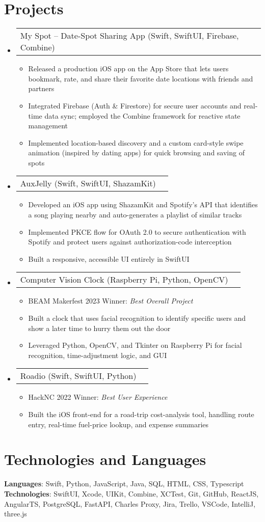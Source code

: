 \documentclass[letterpaper,11pt]{article}
\makeatletter
\newcommand{\resumeItem}[1]{
  \item\small{{#1}}
}
\newcommand{\resumeProjectHeading}[2]{
    \item
    \begin{tabular*}{0.97\textwidth}{l@{\extracolsep{\fill}}r}
      \small#1 & #2 \\
    \end{tabular*}\vspace{-7pt}
}
\newcommand{\resumeSubHeadingListStart}{\begin{itemize}[leftmargin=0.15in, label={}]}
\newcommand{\resumeSubHeadingListEnd}{\end{itemize}}
\newcommand{\resumeItemListStart}{\begin{itemize}}
\newcommand{\resumeItemListEnd}{\end{itemize}\vspace{-5pt}}
\makeatother
\begin{document}
\section{Projects}
  \resumeSubHeadingListStart
    \resumeProjectHeading{My Spot – Date-Spot Sharing App (Swift, SwiftUI, Firebase, Combine)}{}
      \resumeItemListStart
        \resumeItem{Released a production iOS app on the App Store that lets users bookmark, rate, and share their favorite date locations with friends and partners}
        \resumeItem{Integrated Firebase (Auth \& Firestore) for secure user accounts and real-time data sync; employed the Combine framework for reactive state management}
        \resumeItem{Implemented location-based discovery and a custom card-style swipe animation (inspired by dating apps) for quick browsing and saving of spots}
      \resumeItemListEnd
    \resumeProjectHeading{AuxJelly (Swift, SwiftUI, ShazamKit)}{}
      \resumeItemListStart
        \resumeItem{Developed an iOS app using ShazamKit and Spotify’s API that identifies a song playing nearby and auto-generates a playlist of similar tracks}
        \resumeItem{Implemented PKCE flow for OAuth 2.0 to secure authentication with Spotify and protect users against authorization-code interception}
        \resumeItem{Built a responsive, accessible UI entirely in SwiftUI}
      \resumeItemListEnd
    \resumeProjectHeading{Computer Vision Clock (Raspberry Pi, Python, OpenCV)}{}
      \resumeItemListStart
        \resumeItem{BEAM Makerfest 2023 Winner: \emph{Best Overall Project}}
        \resumeItem{Built a clock that uses facial recognition to identify specific users and show a later time to hurry them out the door}
        \resumeItem{Leveraged Python, OpenCV, and Tkinter on Raspberry Pi for facial recognition, time-adjustment logic, and GUI}
      \resumeItemListEnd
    \resumeProjectHeading{Roadio (Swift, SwiftUI, Python)}{}
      \resumeItemListStart
        \resumeItem{HackNC 2022 Winner: \emph{Best User Experience}}
        \resumeItem{Built the iOS front-end for a road-trip cost-analysis tool, handling route entry, real-time fuel-price lookup, and expense summaries}
      \resumeItemListEnd
  \resumeSubHeadingListEnd

\section{Technologies and Languages}
  \begin{itemize}[leftmargin=0.15in, label={}]
    \small{\item{
      \textbf{Languages}{: Swift, Python, JavaScript, Java, SQL, HTML, CSS, Typescript} \\
      \textbf{Technologies}{: SwiftUI, Xcode, UIKit, Combine, XCTest, Git, GitHub, ReactJS, AngularTS, PostgreSQL, FastAPI, Charles Proxy, Jira, Trello, VSCode, IntelliJ, three.js}
    }}
  \end{itemize}

\end{document}
